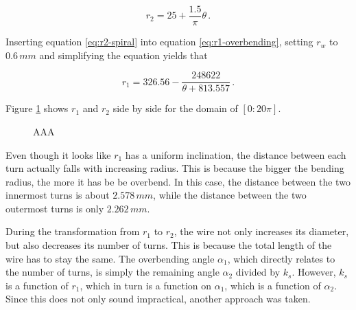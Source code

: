 \begin{equation}\label{eq:r2-spiral}
    r_2 = 25 + \frac{1.5}{\pi} \theta\,.
\end{equation}

Inserting equation \ref{eq:r2-spiral} into equation \ref{eq:r1-overbending}, setting \(r_w\) to \(0.6\,mm\) and simplifying the equation yields that

\begin{equation}
    r_1 = 326.56 - \frac{248622}{\theta + 813.557}\,.
\end{equation}

Figure \ref{fig:spirals} shows \(r_1\) and \(r_2\) side by side for the domain of \([0:20\pi]\).

\begin{figure}[h!]
    \centering
    \caption{AAA}
    \label{fig:spirals}
\end{figure}

Even though it looks like \(r_1\) has a uniform inclination, the distance between each turn actually falls with increasing radius. This is because the bigger the bending radius, the more it has be be overbend. In this case, the distance between the two innermost turns is about \(2.578\,mm\), while the distance between the two outermost turns is only \(2.262\,mm\).

During the transformation from \(r_1\) to \(r_2\), the wire not only increases its diameter, but also decreases its number of turns. This is because the total length of the wire has to stay the same. The overbending angle \(\alpha_1\), which directly relates to the number of turns, is simply the remaining angle \(\alpha_2\) divided by \(k_s\). However, \(k_s\) is a function of \(r_1\), which in turn is a function on \(\alpha_1\), which is a function of \(\alpha_2\). Since this does not only sound impractical, another approach was taken.

